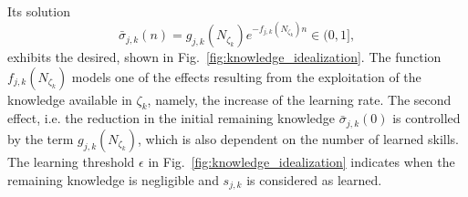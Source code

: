 \documentclass[12pt]{article}
\begin{document}
\noindent Its solution
\begin{equation}\label{eq:knowledge_exponential_form}
	\bar{\sigma}_{j,k}(n) = g_{j,k}\left(N_{\zeta_k}\right) e ^{-f_{j,k}\left(N_{\zeta_k}\right) n} \in (0,1],
\end{equation}
exhibits the desired, shown in Fig.~\ref{fig:knowledge_idealization}. The function $f_{j,k}\left(N_{\zeta_k}\right)$ models one of the effects resulting from the exploitation of the knowledge available in $\zeta_k$, namely, the increase of the learning rate. The second effect, i.e. the reduction in the initial remaining knowledge $\bar{\sigma}_{j,k}(0)$ is controlled by the term $g_{j,k}\left(N_{\zeta_k}\right)$, which is also dependent on the number of learned skills. The learning threshold $\epsilon$ in Fig.~\ref{fig:knowledge_idealization} indicates when the remaining knowledge is negligible and $s_{j,k}$ is considered as learned.

\end{document}
